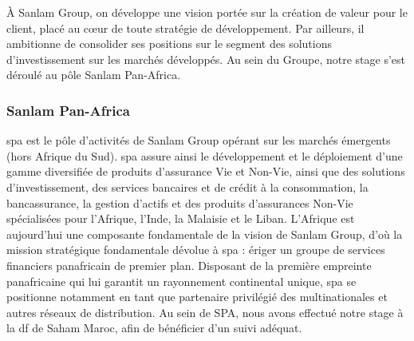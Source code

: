 \`A  Sanlam Group, on développe une vision portée sur la création de valeur pour le client, placé au cœur de toute stratégie de développement. Par ailleurs, il ambitionne de consolider ses positions sur le segment des solutions d’investissement sur les marchés développés. 
Au sein du Groupe, notre stage s'est d\'eroul\'e au p\^ole Sanlam Pan-Africa. 
\subsubsection{\textbf{Sanlam Pan-Africa}}
\acrfull{spa} est le pôle d’activités de Sanlam Group opérant sur les marchés émergents (hors Afrique du Sud). \acrshort{spa} assure ainsi le développement et le déploiement d’une gamme diversifiée de produits d’assurance Vie et Non-Vie, ainsi que des solutions d’investissement, des services bancaires et de crédit à la consommation, la bancassurance, la gestion d’actifs et des produits d’assurances Non-Vie spécialisées pour l’Afrique, l’Inde, la Malaisie et le Liban. L’Afrique est aujourd’hui une composante fondamentale de la vision de Sanlam Group, d’où la mission stratégique fondamentale dévolue à \acrshort{spa} : ériger un groupe de services financiers panafricain de premier plan. Disposant de la première empreinte panafricaine qui lui garantit un rayonnement continental unique, \acrshort{spa} se positionne notamment en tant que partenaire privilégié des multinationales et autres réseaux de distribution. Au sein de SPA, nous avons effectu\'e notre stage \`a la \acrfull{df} de Saham Maroc, afin de b\'en\'eficier d'un suivi ad\'equat.

